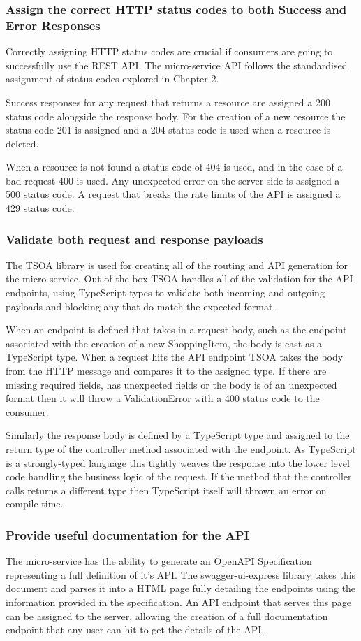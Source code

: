 \subsubsection{Assign the correct HTTP status codes to both Success and Error Responses}
Correctly assigning HTTP status codes are crucial if consumers are going to successfully use the REST API. The micro-service API follows the standardised assignment of status codes explored in Chapter 2.

Success responses for any request that returns a resource  are assigned a 200 status code alongside the response body. For the creation of a new resource the status code 201 is assigned and a 204 status code is used when a resource is deleted.

When a resource is not found a status code of 404 is used, and in the case of a bad request 400 is used. Any unexpected error on the server side is assigned a 500 status code. A request that breaks the rate limits of the API is assigned a 429 status code.
\subsubsection{Validate both request and response payloads}
The TSOA library is used for creating all of the routing and API generation for the micro-service. Out of the box TSOA handles all of the validation for the API endpoints, using TypeScript types to validate both incoming and outgoing payloads and blocking any that do match the expected format.

When an endpoint is defined that takes in a request body, such as the endpoint associated with the creation of a new ShoppingItem, the body is cast as a TypeScript type. When a request hits the API endpoint TSOA takes the body from the HTTP message and compares it to the assigned type. If there are missing required fields, has unexpected fields or the body is of an unexpected format then it will throw a ValidationError with a 400 status code to the consumer.

Similarly the response body is defined by a TypeScript type and assigned to the return type of the controller method associated with the endpoint. As TypeScript is a strongly-typed language this tightly weaves the response into the lower level code handling the business logic of the request. If the method that the controller calls returns a different type then TypeScript itself will thrown an error on compile time.
\subsubsection{Provide useful documentation for the API}
The micro-service has the ability to generate an OpenAPI Specification representing a full definition of it's API. The swagger-ui-express library takes this document and parses it into a HTML page fully detailing the endpoints using the information provided in the specification. An API endpoint that serves this page can be assigned to the server, allowing the creation of a full documentation endpoint that any user can hit to get the details of the API.

